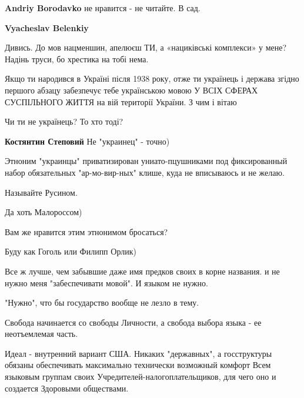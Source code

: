 \begin{itemize}
\begin{itemize}
\textbf{Andriy Borodavko} не нравится - не читайте.
В сад.

 
\textbf{Vyacheslav Belenkiy}

Дивись. До мов нацменшин, апелюєш ТИ, а «нациківські комплекси» у мене? Надінь труси, бо хрестика на тобі нема.

Якщо ти народився в Україні після 1938 року, отже ти українець і держава згідно
першого абзацу забезпечує тебе українською мовою У ВСІХ СФЕРАХ СУСПІЛЬНОГО
ЖИТТЯ на вій території України. З чим і вітаю

Чи ти не українець? То хто тоді?

 
\textbf{Костянтин Степовий} Не "украинец" - точно)

Этноним "украинцы" приватизирован униато-пцушниками под фиксированный набор
обязательных "ар-мо-вир-ных" клише, куда не вписываюсь и не желаю.

Называйте Русином.

Да хоть Малороссом)

Вам же нравится этим этнонимом бросаться?

Буду как Гоголь или Филипп Орлик)

Все ж лучше, чем забывшие даже имя предков своих в корне названия.  и не нужно
меня "забеспечивати мовой". И языком не нужно.

"Нужно", что бы государство вообще не лезло в тему.

Свобода начинается со свободы Личности, а свобода выбора языка - ее
неотъемлемая часть.

Идеал - внутренний вариант США. Никаких "державных", а госструктуры обязаны
обеспечивать максимально технически возможный комфорт Всем языковым группам
своих Учредителей-налогоплательщиков, для чего оно и создается Здоровыми
обществами.

 

\end{itemize}
\end{itemize}
